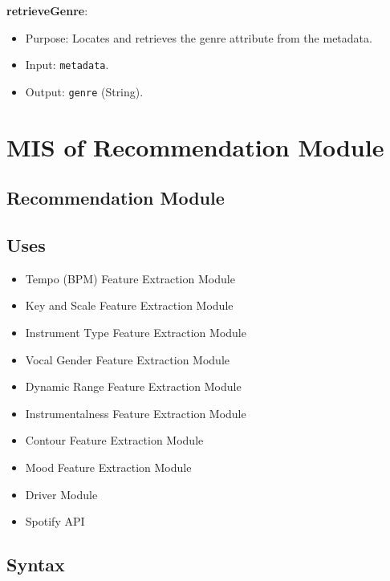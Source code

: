 \documentclass[12pt, titlepage]{article}
\begin{document}
\textbf{retrieveGenre}:
\begin{itemize}
\item Purpose: Locates and retrieves the genre attribute from the metadata.
\item Input: \texttt{metadata}.
\item Output: \texttt{genre} (String).
\end{itemize}

\section{MIS of Recommendation Module} 

\subsection{Recommendation Module}


\subsection{Uses}
\begin{itemize}
  \item Tempo (BPM) Feature Extraction Module
  \item Key and Scale Feature Extraction Module
  \item Instrument Type Feature Extraction Module
  \item Vocal Gender Feature Extraction Module
  \item Dynamic Range Feature Extraction Module
  \item Instrumentalness Feature Extraction Module
  \item Contour Feature Extraction Module
  \item Mood Feature Extraction Module
  \item Driver Module
  \item Spotify API
\end{itemize}

\subsection{Syntax}
\end{document}
